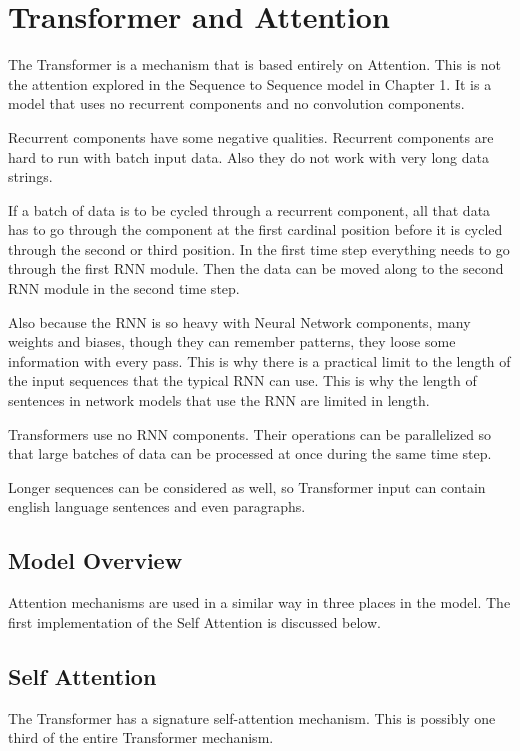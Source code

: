 
\section{Transformer and Attention}

The Transformer is a mechanism that is based entirely on Attention. This is not the attention explored in the Sequence to Sequence model in Chapter 1. It is a model that uses no recurrent components and no convolution components. 

Recurrent components have some negative qualities. Recurrent components are hard to run with batch input data. Also they do not work with very long data strings. 

If a batch of data is to be cycled through a recurrent component, all that data has to go through the component at the first cardinal position before it is cycled through the second or third position. In the first time step everything needs to go through the first RNN module. Then the data can be moved along to the second RNN  module in the second time step.

Also because the RNN is so heavy with Neural Network components, many weights and biases, though they can remember patterns, they loose some information with every pass. This is why there is a practical limit to the length of the input sequences that the typical RNN can use. This is why the length of sentences in network models that use the RNN are limited in length.

Transformers use no RNN components. Their operations can be parallelized so that large batches of data can be processed at once during the same time step. 

Longer sequences can be considered as well, so Transformer input can contain english language sentences and even paragraphs.

\subsection*{Model Overview}
Attention mechanisms are used in a similar way in three places in the model. The first implementation of the Self Attention is discussed below.


\subsection*{Self Attention}

The Transformer has a signature self-attention mechanism. This is possibly one third of the entire Transformer mechanism. 



